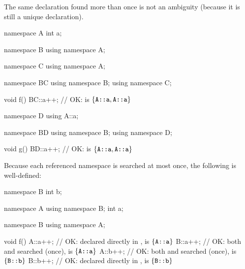 \pnum
\begin{note}
The same declaration found more than once is not an ambiguity (because
it is still a unique declaration).
\begin{example}
\begin{codeblock}
namespace A {
  int a;
}

namespace B {
  using namespace A;
}

namespace C {
  using namespace A;
}

namespace BC {
  using namespace B;
  using namespace C;
}

void f()
{
  BC::a++;          // OK:  is $\{ \texttt{A::a}, \texttt{A::a} \}$
}

namespace D {
  using A::a;
}

namespace BD {
  using namespace B;
  using namespace D;
}

void g()
{
  BD::a++;          // OK:  is $\{ \texttt{A::a}, \texttt{A::a} \}$
}
\end{codeblock}
\end{example}
\end{note}

\pnum
\begin{example}
Because each referenced namespace is searched at most once, the
following is well-defined:

\begin{codeblock}
namespace B {
  int b;
}

namespace A {
  using namespace B;
  int a;
}

namespace B {
  using namespace A;
}

void f()
{
  A::a++;           // OK:  declared directly in ,  is $\{ \texttt{A::a} \}$
  B::a++;           // OK: both  and  searched (once),  is $\{ \texttt{A::a} \}$
  A::b++;           // OK: both  and  searched (once),  is $\{ \texttt{B::b} \}$
  B::b++;           // OK:  declared directly in ,  is $\{ \texttt{B::b} \}$
}
\end{codeblock}
\end{example}

